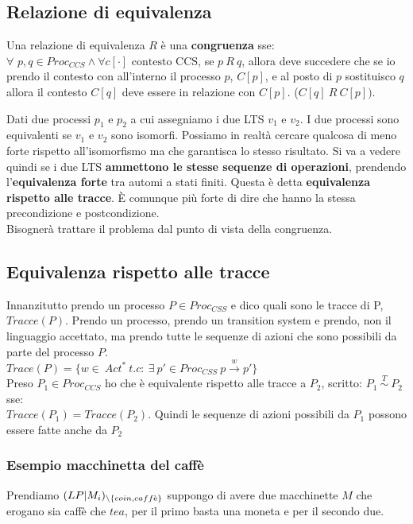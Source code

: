 \subsection{Relazione di equivalenza}
Una relazione di equivalenza $R$ è una \textbf{congruenza} sse:$\forall \,\,p,q\in Proc_{CCS} \land \forall c[\cdot] \mbox{ contesto CCS}$, se $p\ R \ q$, allora deve succedere che se io prendo il contesto con all'interno il processo $p$, $C[p]$, e al posto di $p$ sostituisco $q$ allora il contesto $C[q]$ deve essere in relazione con $C[p]$. ($C[q] \ R \ C[p])$.

Dati due processi $p_1$ e $p_2$ a cui assegniamo i due LTS $v_1$ e $v_2$. I due processi sono equivalenti se $v_1$ e $v_2$ sono isomorfi. Possiamo in realtà cercare qualcosa di meno forte rispetto all'isomorfismo ma che garantisca lo stesso risultato. Si va a vedere quindi se i due LTS \textbf{ammettono le stesse sequenze di operazioni}, prendendo l'\textbf{equivalenza forte} tra automi a stati finiti. Questa è detta \textbf{equivalenza rispetto alle tracce}. È comunque più forte di dire che hanno la stessa precondizione e postcondizione.\\ Bisognerà trattare il problema dal punto di vista della congruenza. 

\subsection{Equivalenza rispetto alle tracce}
Innanzitutto prendo un processo $P \in Proc_{CSS}$ e dico quali sono le tracce di P, $Tracce(P)$. Prendo un processo, prendo un transition system e prendo, non il linguaggio accettato, ma prendo tutte le sequenze di azioni che sono possibili da parte del processo $P$.\\ $Trace(P) = \{w \in \ Act^* \ t.c: \ \exists \ p' \in Proc_{CSS} \ p \stackrel{w} \to p' \}$\\

Preso $P_1\in Proc_{CCS}$ ho che è equivalente rispetto alle tracce a $P_2$, scritto: $P_1 \ \stackrel{T}{\sim} \  P_2$ sse: \\ $Tracce(P_1) = Tracce (P_2)$. Quindi le sequenze di azioni possibili da $P_1$ possono essere fatte anche da $P_2$

\subsubsection{Esempio macchinetta del caffè} 
Prendiamo $(LP|M_i)_{\backslash\{coin, caff\textnormal{è}\}}$ suppongo di avere due macchinette $M$ che erogano sia caffè che $tea$, per il primo basta una moneta e per il secondo due. \\
 
